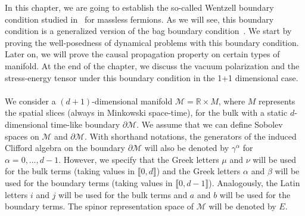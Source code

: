 In this chapter, we are going to establish the so-called Wentzell boundary condition studied in~\cite{Zahn2016} for massless fermions.
As we will see, this boundary condition is a generalized version of the bag boundary condition~\cite{Chodos1974}.
We start by proving the well-posedness of dynamical problems with this boundary condition. 
Later on, we will prove the causal propagation property on certain types of manifold.
At the end of the chapter, 
we discuss the vacuum polarization and the stress-energy tensor under this boundary condition in the 1+1 dimensional case.
\\\\
We consider a $(d+1)$-dimensional manifold $\mathcal{M} = \mathbb{R}\times M$, where $M$ represents the spatial slices (always in Minkowski space-time), for the bulk with a static $d$-dimensional time-like boundary $\partial \mathcal{M}$.
We assume that we can define Sobolev spaces on $\mathcal{M}$ and $\partial \mathcal{M}$.
%
With shorthand notations, the generators of the induced Clifford algebra on the boundary $\partial \mathcal{M}$ will also be denoted by $\gamma^\alpha$ for $\alpha = 0 ,\ldots, d-1$. 
However, we specify that the Greek letters $\mu$ and $\nu$ will be used for the bulk terms (taking values in $\llbracket 0, d \rrbracket$) and the Greek letters $\alpha$ and $\beta$ will be used for the boundary terms (taking values in $\llbracket 0, d-1 \rrbracket$).
Analogously, the Latin letters $i $ and $j$ will be used for the bulk terms and $a$ and $b$ will be used for the boundary terms. 
The spinor representation space of $\mathcal{M}$ will be denoted by $E$.
%
